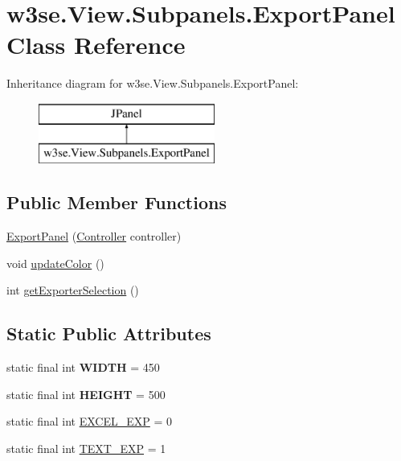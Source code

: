 \hypertarget{classw3se_1_1_view_1_1_subpanels_1_1_export_panel}{\section{w3se.\-View.\-Subpanels.\-Export\-Panel Class Reference}
\label{classw3se_1_1_view_1_1_subpanels_1_1_export_panel}
}
Inheritance diagram for w3se.\-View.\-Subpanels.\-Export\-Panel\-:\begin{figure}[H]
\begin{center}
\leavevmode
\includegraphics[height=2.000000cm]{classw3se_1_1_view_1_1_subpanels_1_1_export_panel}
\end{center}
\end{figure}
\subsection*{Public Member Functions}
\begin{DoxyCompactItemize}
\item 
\hyperlink{classw3se_1_1_view_1_1_subpanels_1_1_export_panel_a1e0e6b6ddd86d64c4822030ab378640c}{Export\-Panel} (\hyperlink{interfacew3se_1_1_controller_1_1_controller}{Controller} controller)
\item 
void \hyperlink{classw3se_1_1_view_1_1_subpanels_1_1_export_panel_ab23bdb67345b94c9400a7ba0182e6791}{update\-Color} ()
\item 
int \hyperlink{classw3se_1_1_view_1_1_subpanels_1_1_export_panel_a158e5db31e11d3e7533e05cb478a5496}{get\-Exporter\-Selection} ()
\end{DoxyCompactItemize}
\subsection*{Static Public Attributes}
\begin{DoxyCompactItemize}
\item 
\hypertarget{classw3se_1_1_view_1_1_subpanels_1_1_export_panel_a70af59047642380f412f693c78b9dcad}{static final int {\bfseries W\-I\-D\-T\-H} = 450}\label{classw3se_1_1_view_1_1_subpanels_1_1_export_panel_a70af59047642380f412f693c78b9dcad}

\item 
\hypertarget{classw3se_1_1_view_1_1_subpanels_1_1_export_panel_ac34f46f103082b3dbf248dd9b379d3e3}{static final int {\bfseries H\-E\-I\-G\-H\-T} = 500}\label{classw3se_1_1_view_1_1_subpanels_1_1_export_panel_ac34f46f103082b3dbf248dd9b379d3e3}

\item 
static final int \hyperlink{classw3se_1_1_view_1_1_subpanels_1_1_export_panel_a4d75ab1837aca747fdf59bd85eef7bb7}{E\-X\-C\-E\-L\-\_\-\-E\-X\-P} = 0
\item 
static final int \hyperlink{classw3se_1_1_view_1_1_subpanels_1_1_export_panel_a84eaaf230a05485b3e8d742d817884d1}{T\-E\-X\-T\-\_\-\-E\-X\-P} = 1
\end{DoxyCompactItemize}


